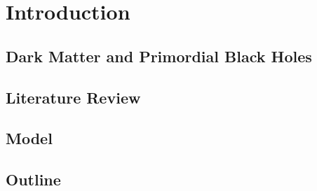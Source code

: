 \documentclass[12pt]{report}
\begin{document}
\doublespacing
\linespread{2}

\chapter{Introduction}

\section{Dark Matter and Primordial Black Holes}

\section{Literature Review}

\section{Model}

\section{Outline}
\end{document}
